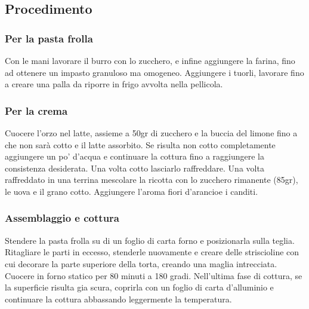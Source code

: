 \subsection{Procedimento}
\subsubsection{Per la pasta frolla}
Con le mani lavorare il burro con lo zucchero, e infine aggiungere la farina, fino ad ottenere un impasto granuloso ma omogeneo. Aggiungere i tuorli, lavorare fino a creare una palla da riporre in frigo avvolta nella pellicola.
\subsubsection{Per la crema}
Cuocere l'orzo nel latte, assieme a 50gr di zucchero e la buccia del limone fino a che non sarà cotto e il latte assorbito. Se risulta non cotto completamente aggiungere un po' d'acqua e continuare la cottura fino a raggiungere la consistenza desiderata. Una volta cotto lasciarlo raffreddare. Una volta raffreddato in una terrina mescolare la ricotta con lo zucchero rimanente (85gr), le uova e il grano cotto. Aggiungere l'aroma fiori d'arancioe i canditi.
\subsubsection{Assemblaggio e cottura}
Stendere la pasta frolla su di un foglio di carta forno e posizionarla sulla teglia. Ritagliare le parti in eccesso, stenderle nuovamente e creare delle striscioline con cui decorare la parte superiore della torta, creando una maglia intrecciata.\\
Cuocere in forno statico per 80 minuti a 180 gradi. Nell'ultima fase di cottura, se la superficie risulta gia scura, coprirla con un foglio di carta d'alluminio e continuare la cottura abbassando leggermente la temperatura.
\pagebreak